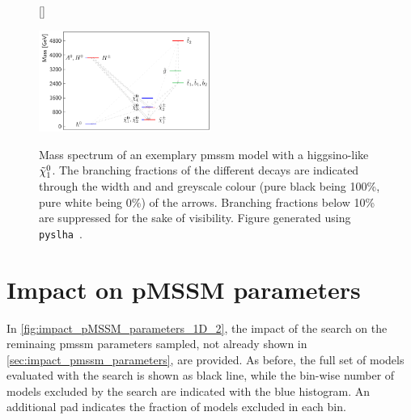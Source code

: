 \begin{figure}[h]
[\FBwidth]
{\caption{Mass spectrum of an exemplary \gls{pmssm} model with a higgsino-like $\tilde{\chi}_1^0$. The branching fractions of the different decays are indicated through the width and and greyscale colour (pure black being 100\%, pure white being 0\%) of the arrows. Branching fractions below 10\% are suppressed for the sake of visibility. Figure generated using \texttt{pyslha}~\cite{pyslha:2013jua}.}\label{fig:higgsino_spectrum}}
{\includegraphics[width=0.50\textwidth]{thesis_plot_6898.pdf}}
\end{figure}

\FloatBarrier

\section{Impact on pMSSM parameters}

In \cref{fig:impact_pMSSM_parameters_1D_2}, the impact of the \onelepton search on the reminaing \gls{pmssm} parameters sampled, not already shown in \cref{sec:impact_pmssm_parameters}, are provided. As before, the full set of models evaluated with the \onelepton search is shown as black line, while the bin-wise number of models excluded by the search are indicated with the blue histogram. An additional pad indicates the fraction of models excluded in each bin.

